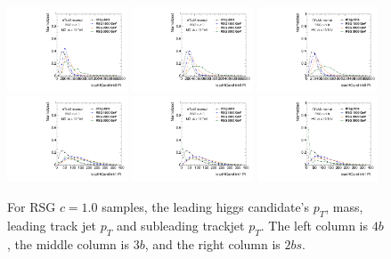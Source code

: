\begin{figure}[htbp!]
\begin{center}
\includegraphics[width=0.32\textwidth,angle=-90]{figures/boosted/Truth/Moriond_comp_0_FourTag_Signal_leadHCand_trk0_Pt.pdf}
\includegraphics[width=0.32\textwidth,angle=-90]{figures/boosted/Truth/Moriond_comp_0_ThreeTag_Signal_leadHCand_trk0_Pt.pdf}
\includegraphics[width=0.32\textwidth,angle=-90]{figures/boosted/Truth/Moriond_comp_0_TwoTag_split_Signal_leadHCand_trk0_Pt.pdf}\\
\includegraphics[width=0.32\textwidth,angle=-90]{figures/boosted/Truth/Moriond_comp_0_FourTag_Signal_leadHCand_trk1_Pt.pdf}
\includegraphics[width=0.32\textwidth,angle=-90]{figures/boosted/Truth/Moriond_comp_0_ThreeTag_Signal_leadHCand_trk1_Pt.pdf}
\includegraphics[width=0.32\textwidth,angle=-90]{figures/boosted/Truth/Moriond_comp_0_TwoTag_split_Signal_leadHCand_trk1_Pt.pdf}\\
\caption{For RSG $c=1.0$ samples, the leading higgs candidate's $p_T$, mass, leading track jet $p_T$ and subleading trackjet $p_T$. The left column is $4b$, the middle column is $3b$, and the right column is $2bs$.}
\label{fig:app-signal-leadHCand}
\end{center}
\end{figure}



